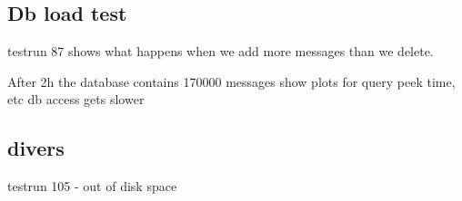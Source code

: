 \documentclass[milestone1.tex]{subfiles}
\begin{document}
\subsection{Db load test}

testrun 87 shows what happens when we add more messages than we delete. 

After 2h the database contains 170000 messages
show plots for query peek time, etc
db access gets slower

\subsection{divers}

testrun 105 - out of disk space
\end{document}
